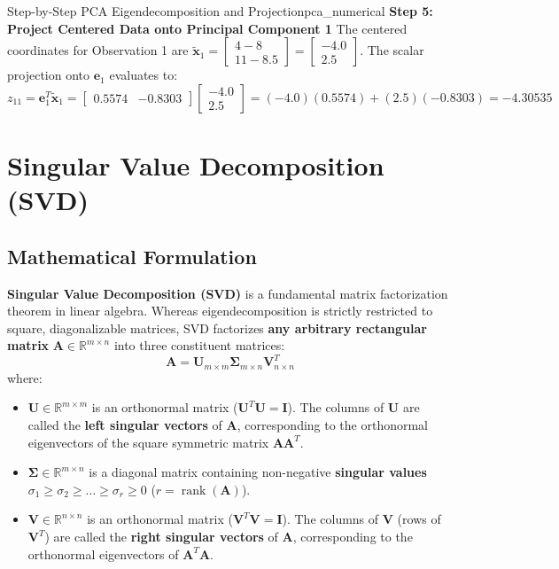 \begin{example}{Step-by-Step PCA Eigendecomposition and Projection}{pca_numerical}
\textbf{Step 5: Project Centered Data onto Principal Component 1}
The centered coordinates for Observation 1 are $\tilde{\mathbf{x}}_1 = \begin{bmatrix} 4 - 8 \\ 11 - 8.5 \end{bmatrix} = \begin{bmatrix} -4.0 \\ 2.5 \end{bmatrix}$. The scalar projection onto $\mathbf{e}_1$ evaluates to:
\begin{equation}
    z_{11} = \mathbf{e}_1^T \tilde{\mathbf{x}}_1 = \begin{bmatrix} 0.5574 & -0.8303 \end{bmatrix} \begin{bmatrix} -4.0 \\ 2.5 \end{bmatrix} = (-4.0)(0.5574) + (2.5)(-0.8303) = \mathbf{-4.30535}
\end{equation}
\end{example}

\section{Singular Value Decomposition (SVD)}

\subsection{Mathematical Formulation}
\textbf{Singular Value Decomposition (SVD)} is a fundamental matrix factorization theorem in linear algebra. Whereas eigendecomposition is strictly restricted to square, diagonalizable matrices, SVD factorizes \textbf{any arbitrary rectangular matrix} $\mathbf{A} \in \mathbb{R}^{m \times n}$ into three constituent matrices:
\begin{equation}
    \mathbf{A} = \mathbf{U}_{m \times m} \boldsymbol{\Sigma}_{m \times n} \mathbf{V}^T_{n \times n}
\end{equation}
where:
\begin{itemize}
    \item $\mathbf{U} \in \mathbb{R}^{m \times m}$ is an orthonormal matrix ($\mathbf{U}^T \mathbf{U} = \mathbf{I}$). The columns of $\mathbf{U}$ are called the \textbf{left singular vectors} of $\mathbf{A}$, corresponding to the orthonormal eigenvectors of the square symmetric matrix $\mathbf{A} \mathbf{A}^T$.
    \item $\boldsymbol{\Sigma} \in \mathbb{R}^{m \times n}$ is a diagonal matrix containing non-negative \textbf{singular values} $\sigma_1 \ge \sigma_2 \ge \dots \ge \sigma_r \ge 0$ ($r = \operatorname{rank}(\mathbf{A})$).
    \item $\mathbf{V} \in \mathbb{R}^{n \times n}$ is an orthonormal matrix ($\mathbf{V}^T \mathbf{V} = \mathbf{I}$). The columns of $\mathbf{V}$ (rows of $\mathbf{V}^T$) are called the \textbf{right singular vectors} of $\mathbf{A}$, corresponding to the orthonormal eigenvectors of $\mathbf{A}^T \mathbf{A}$.
\end{itemize}


